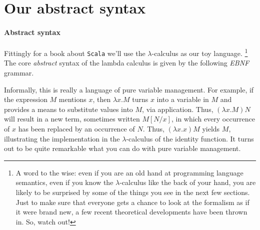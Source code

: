 \section{Our abstract syntax}

\paragraph{Abstract syntax}
Fittingly for a book about \texttt{Scala} we'll use the
$\lambda$-calculus as our toy language. \footnote{A word to the wise:
  even if you are an old hand at programming language semantics, even
  if you know the $\lambda$-calculus like the back of your hand, you
  are likely to be surprised by some of the things you see in the next
  few sections. Just to make sure that everyone gets a chance to look
  at the formalism as if it were brand new, a few recent theoretical
  developments have been thrown in. So, watch out!} The core
\textit{abstract} syntax of the lambda calculus is given by the
following \textit{EBNF} grammar.


Informally, this is really a language of pure variable management. For
example, if the expression $M$ mentions $x$, then $\lambda x. M$ turns
$x$ into a variable in $M$ and provides a means to substitute values
into $M$, via application. Thus, $(\lambda x.M)N$ will result in a new
term, sometimes written $M[N/x]$, in which every occurrence of $x$ has
been replaced by an occurrence of $N$. Thus, $(\lambda x.x)M$ yields
$M$, illustrating the implementation in the $\lambda$-calculus of the
identity function. It turns out to be quite remarkable what you can do
with pure variable management.

